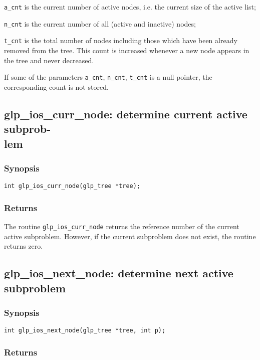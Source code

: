 \verb|a_cnt| is the current number of active nodes, i.e. the current
size of the active list;

\verb|n_cnt| is the current number of all (active and inactive) nodes;

\verb|t_cnt| is the total number of nodes including those which have
been already removed from the tree. This count is increased whenever
a new node appears in the tree and never decreased.

If some of the parameters \verb|a_cnt|, \verb|n_cnt|, \verb|t_cnt| is
a null pointer, the corresponding count is not stored.

\subsection{glp\_ios\_curr\_node: determine current active subprob-\\
lem}

\subsubsection*{Synopsis}

\begin{verbatim}
int glp_ios_curr_node(glp_tree *tree);
\end{verbatim}

\subsubsection*{Returns}

The routine \verb|glp_ios_curr_node| returns the reference number of the
current active subproblem. However, if the current subproblem does not
exist, the routine returns zero.

\newpage

\subsection{glp\_ios\_next\_node: determine next active subproblem}

\subsubsection*{Synopsis}

\begin{verbatim}
int glp_ios_next_node(glp_tree *tree, int p);
\end{verbatim}

\subsubsection*{Returns}


